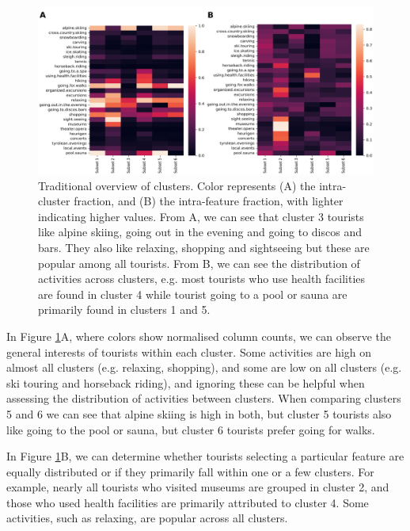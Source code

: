\documentclass[article]{ajs}
\begin{document}
\begin{figure}[h!]
    \centering
    \includegraphics[width=1\textwidth]{winteractiv_heatmap.pdf}
    \caption{Traditional overview of clusters. Color represents (A) the intra-cluster fraction, and (B) the intra-feature fraction, with lighter indicating higher values. From A, we can see that cluster 3 tourists like alpine skiing, going out in the evening and going to discos and bars. They also like relaxing, shopping and sightseeing but these are popular among all tourists. From B, we can see the distribution of activities across clusters, e.g. most tourists who use health facilities are found in cluster 4 while tourist going to a pool or sauna are primarily found in clusters 1 and 5.}
    \label{fig:winteractiv_heatmap}
\end{figure}

In Figure \ref{fig:winteractiv_heatmap}A, where colors show normalised column counts, we can observe the general interests of tourists within each cluster. Some activities are high on almost all clusters (e.g. relaxing, shopping), and some are low on all clusters (e.g. ski touring and horseback riding), and ignoring these can be helpful when assessing the distribution of activities between clusters. When comparing clusters 5 and 6 we can see that alpine skiing is high in both, but cluster 5 tourists also like going to the pool or sauna, but cluster 6 tourists prefer going for walks.  %

In Figure \ref{fig:winteractiv_heatmap}B, we can determine whether tourists selecting a particular feature are equally distributed or if they primarily fall within one or a few clusters.  For example, nearly all tourists who visited museums are grouped in cluster 2, and those who used health facilities are primarily attributed to cluster 4. Some activities, such as relaxing, are popular across all clusters.
\end{document}
